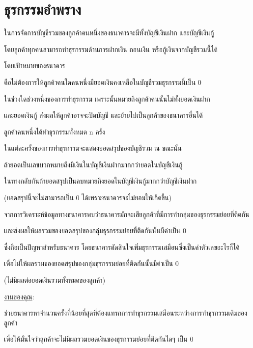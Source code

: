 \documentclass{article}
\begin{document}
\section*{ธุรกรรมอำพราง}

ในการจัดการบัญชีรวมของลูกค้าคนหนึ่งของธนาคารจะมีทั้งบัญชีเงินฝาก และบัญชีเงินกู้

โดยลูกค้าทุกคนสามารถทำธุรกรรมด้านการฝากเงิน ถอนเงิน หรือกู้เงินจากบัญชีรวมนี้ได้

โดยเป้าหมายของธนาคาร

คือไม่ต้องการให้ลูกค้าคนใดคนหนึ่งมียอดเงินคงเหลือในบัญชีรวมธุรกรรมนี้เป็น 0

ในช่วงใดช่วงหนึ่งของการทำธุรกรรม เพราะนั้นหมายถึงลูกค้าคนนั้นไม่ทั้งยอดเงินฝาก

และยอดเงินกู้ ส่งผลให้ลูกค้าอาจจะปิดบัญชี และย้ายไปเป็นลูกค้าของธนาคารอื่นได้



ลูกค้าคนหนึ่งได้ทำธุรกรรมทั้งหมด n ครั้ง

ในแต่ละครั้งของการทำธุรกรรมจะแสดงยอดสรุปของบัญชีรวม ณ ขณะนั้น

ถ้ายอดเป็นเลขบวกหมายถึงมีเงินในบัญชีเงินฝากมากกว่ายอดในบัญชีเงินกู้

ในทางกลับกันถ้ายอดสรุปเป็นลบหมายถึงยอดในบัญชีเงินกู้มากกว่าบัญชีเงินฝาก

(ยอดสรุปนี้จะไม่สามารถเป็น 0 ได้เพราะธนาคารจะไม่ยอมให้เกิดขึ้น)

จากการวิเคราะห์ข้อมูลทางธนาคารพบว่าธนาคารมักจะเสียลูกค้าที่มีการทำกลุ่มของธุรกรรมย่อยที่ติดกัน

และส่งผลให้ผลรวมของยอดสรุปของกลุ่มธุรกรรมย่อยที่ติดกันนั้นมีค่าเป็น 0

ซึ่งถือเป็นปัญหาสำหรับธนาคาร โดยธนาคารตัดสินใจเพิ่มธุรกรรมเสมือนซึ่งเป็นค่าตัวเลขอะไรก็ได้

เพื่อไม่ให้ผลรวมของยอดสรุปของกลุ่มธุรกรรมย่อยที่ติดกันนั้นมีค่าเป็น 0

(ไม่มีผลต่อยอดเงินรวมทั้งหมดของลูกค้า)



\ul{งานของคุณ}:

ช่วยธนาคารหาจำนวนครั้งที่น้อยที่สุดที่ต้องแทรกการทำธุรกรรมเสมือนระหว่างการทำธุรกรรมเดิมของลูกค้า

เพื่อให้มั่นใจว่าลูกค้าจะไม่มีผลรวมยอดเงินของธุรกรรมย่อยที่ติดกันใดๆ เป็น 0



\hfill\break



\hfill\break
\end{document}

